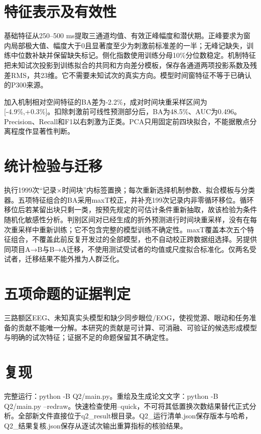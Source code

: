 \documentclass[UTF8,a4paper,11pt]{ctexart}
\begin{document}
\section{特征表示及有效性}

基础特征从250–500 ms提取三通道均值、有效正峰幅度和潜伏期。正峰要求为窗内局部极大值、幅度大于0且显著度至少为刺激前标准差的一半；无峰记缺失，训练中位数补缺并保留缺失标记。侧化指数使用训练分母10\%分位数稳定。机制特征把未知试次投影到训练拟合的共同和方向差分模板，保存各通道两项投影系数及残差RMS，共23维。它不需要未知试次的真实方向。模型时间窗特征不等于已确认的P300来源。


加入机制相对空间特征的BA差为-2.2\%，成对时间块重采样区间为[-4.9\%,+0.3\%]。扣除刺激前可线性预测部分后，BA为48.5\%、AUC为0.496。Precision、Recall和F1以右刺激为正类。PCA只用固定前四块拟合，不能据散点分离程度作显著性判断。

\section{统计检验与迁移}

执行1999次“记录×时间块”内标签置换；每次重新选择机制参数、拟合模板与分类器。五项特征组合的BA采用maxT校正，并补充199次记录内非零循环移位。循环移位后若某留出块只剩一类，按预先规定的可估计条件重新抽取，故该检验为条件随机化敏感性分析。判别区间对已经生成的折外预测进行时间块重采样，没有在每次重采样中重新训练；它不包含完整的模型训练不确定性。maxT覆盖本次五个特征组合，不覆盖此前反复开发过的全部模型，也不自动校正跨数据组选择。另提供同项目A→B与B→A迁移，不使用测试受试者的均值或尺度拟合标准化。仅两名受试者，迁移结果不能外推为人群泛化。


\section{五项命题的证据判定}


三路额区EEG、未知真实头模型和缺少同步眼位/EOG，使视觉源、眼动和任务准备的贡献不能唯一分解。本研究的贡献是可计算、可消融、可验证的候选形成模型与明确的试次特征；证据不足的命题保留其不确定性。

\section{复现}

完整运行：python -B Q2/main.py。重绘及生成论文文字：python -B Q2/main.py --redraw。快速检查使用--quick，不可将其低置换次数结果替代正式分析。全部新文件直接位于q2\_result根目录。Q2\_运行清单.json保存版本与哈希，Q2\_结果复核.json保存从逐试次输出重算指标的核验结果。
\end{document}
